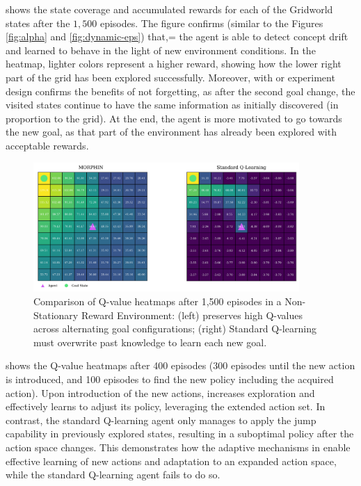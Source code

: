  shows the state coverage and accumulated rewards for each of the Gridworld 
states after the $1,500$ episodes. The figure confirms (similar to the Figures \ref{fig:alpha} and 
\ref{fig:dynamic-eps}) that,= the agent is able to detect concept drift and learned to behave in the light 
of new environment conditions. In the heatmap, lighter colors represent a higher reward, showing how 
the lower right part of the grid has been explored successfully. Moreover, with or experiment design 
confirms the benefits of not forgetting, as after the second goal change, the visited states continue to 
have the same information as initially discovered (in proportion to the grid). At the end, the agent is 
more motivated to go towards the new goal, as that part of the environment has already been 
explored with acceptable rewards.
 
\begin{figure}[hptb]
    \centering
    \includegraphics[width=0.9\textwidth]{figures/q_map_comp}
    \caption{Comparison of Q-value heatmaps after 1,500 episodes in a Non-Stationary Reward Environment: (left) \adaptiverl preserves high Q-values across alternating goal configurations; (right) Standard Q-learning must overwrite past knowledge to learn each new goal.}
    \label{fig:q-value-comp}
\end{figure}

 shows the Q-value heatmaps after 400 episodes (300 episodes until the new action is introduced, and 100 episodes to find the new policy including the acquired action). Upon introduction of the new actions, \adaptiverl increases exploration and effectively learns to adjust its policy, leveraging the extended action set. In contrast, the standard Q-learning agent only manages to apply the jump capability in previously explored states, resulting in a suboptimal policy after the action space changes. This demonstrates how the adaptive mechanisms in \adaptiverl enable effective learning of new actions and adaptation to an expanded action space, while the standard Q-learning agent fails to do so.

